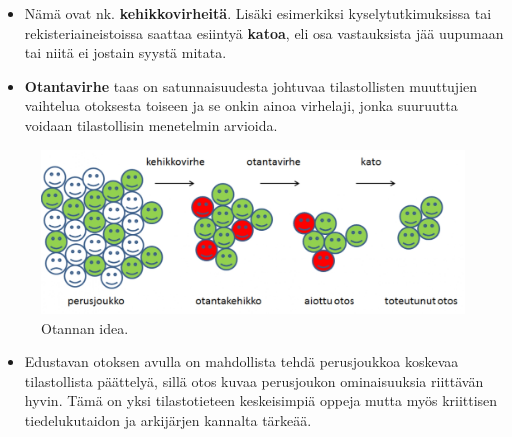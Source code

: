 \documentclass[
]{book}
\providecommand{\tightlist}{%
  \setlength{\itemsep}{0pt}\setlength{\parskip}{0pt}}
\begin{document}
\begin{itemize}
\begin{itemize}
    \begin{itemize}
    \tightlist
    \item
      Nämä ovat nk. \textbf{kehikkovirheitä}. Lisäki esimerkiksi kyselytutkimuksissa tai rekisteriaineistoissa saattaa esiintyä \textbf{katoa}, eli osa vastauksista jää uupumaan tai niitä ei jostain syystä mitata.
    \item
      \textbf{Otantavirhe} taas on satunnaisuudesta johtuvaa tilastollisten muuttujien vaihtelua otoksesta toiseen ja se onkin ainoa virhelaji, jonka suuruutta voidaan tilastollisin menetelmin arvioida.
    \end{itemize}
  \end{itemize}
\end{itemize}

\begin{figure}

{\centering \includegraphics[width=1\linewidth]{images/otanta} 

}

\caption{Otannan idea.}\label{fig:otanta}
\end{figure}

\begin{itemize}
\tightlist
\item
  Edustavan otoksen avulla on mahdollista tehdä perusjoukkoa koskevaa tilastollista päättelyä, sillä otos kuvaa perusjoukon ominaisuuksia riittävän hyvin. Tämä on yksi tilastotieteen keskeisimpiä oppeja mutta myös kriittisen tiedelukutaidon ja arkijärjen kannalta tärkeää.
\end{itemize}
\end{document}
